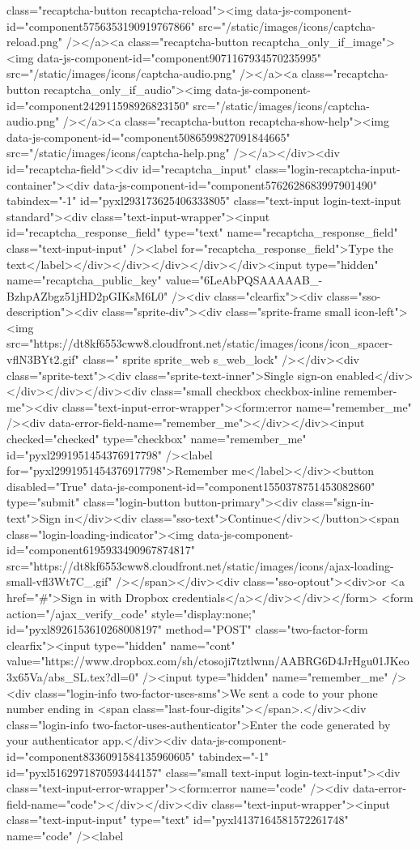 {class="recaptcha-button recaptcha-reload"><img data-js-component-id="component5756353190919767866" src="/static/images/icons/captcha-reload.png" /></a><a class="recaptcha-button recaptcha_only_if_image"><img data-js-component-id="component9071167934570235995" src="/static/images/icons/captcha-audio.png" /></a><a class="recaptcha-button recaptcha_only_if_audio"><img data-js-component-id="component242911598926823150" src="/static/images/icons/captcha-audio.png" /></a><a class="recaptcha-button recaptcha-show-help"><img data-js-component-id="component5086599827091844665" src="/static/images/icons/captcha-help.png" /></a></div><div id="recaptcha-field"><div id="recaptcha_input" class="login-recaptcha-input-container"><div data-js-component-id="component5762628683997901490" tabindex="-1" id="pyxl293173625406333805" class="text-input login-text-input standard"><div class="text-input-wrapper"><input id="recaptcha_response_field" type="text" name="recaptcha_response_field" class="text-input-input" /><label for="recaptcha_response_field">Type the text</label></div></div></div></div></div><input type="hidden" name="recaptcha_public_key" value="6LeAbPQSAAAAAB_-BzhpAZbgz51jHD2pGIKsM6L0" /><div class="clearfix"><div class="sso-description"><div class="sprite-div"><div class="sprite-frame small icon-left"><img src="https://dt8kf6553cww8.cloudfront.net/static/images/icons/icon_spacer-vflN3BYt2.gif" class=" sprite sprite_web s_web_lock" /></div><div class="sprite-text"><div class="sprite-text-inner">Single sign-on enabled</div></div></div></div><div class="small checkbox checkbox-inline remember-me"><div class="text-input-error-wrapper"><form:error name="remember_me" /><div data-error-field-name="remember_me"></div></div><input checked="checked" type="checkbox" name="remember_me" id="pyxl2991951454376917798" /><label for="pyxl2991951454376917798">Remember me</label></div><button disabled="True" data-js-component-id="component1550378751453082860" type="submit" class="login-button button-primary"><div class="sign-in-text">Sign in</div><div class="sso-text">Continue</div></button><span class="login-loading-indicator"><img data-js-component-id="component6195933490967874817" src="https://dt8kf6553cww8.cloudfront.net/static/images/icons/ajax-loading-small-vfl3Wt7C_.gif" /></span></div><div class="sso-optout"><div>or <a href="#">Sign in with Dropbox credentials</a></div></div></form> <form action="/ajax_verify_code" style="display:none;" id="pyxl8926153610268008197" method="POST" class="two-factor-form clearfix"><input type="hidden" name="cont" value="https://www.dropbox.com/sh/ctosoji7tztlwnn/AABRG6D4JrHgu01JKeo3x65Va/abs_SL.tex?dl=0" /><input type="hidden" name="remember_me" /><div class="login-info two-factor-uses-sms">We sent a code to your phone number ending in <span class="last-four-digits"></span>.</div><div class="login-info two-factor-uses-authenticator">Enter the code generated by your authenticator app.</div><div data-js-component-id="component8336091584135960605" tabindex="-1" id="pyxl5162971870593444157" class="small text-input login-text-input"><div class="text-input-error-wrapper"><form:error name="code" /><div data-error-field-name="code"></div></div><div class="text-input-wrapper"><input class="text-input-input" type="text" id="pyxl4137164581572261748" name="code" /><label }
